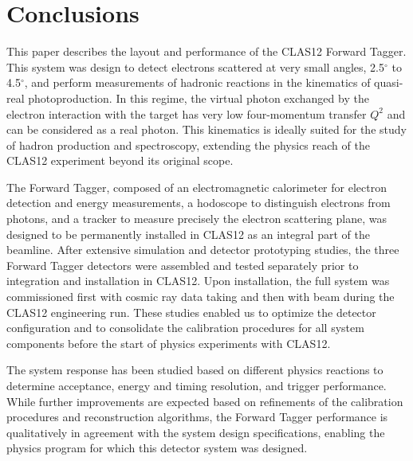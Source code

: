 \section{Conclusions}

This paper describes the layout and performance of the CLAS12 Forward Tagger. This system was design to detect
electrons scattered at very small angles, 2.5$^\circ$ to 4.5$^\circ$, and perform measurements of hadronic reactions
in the kinematics of quasi-real photoproduction. In this regime, the virtual photon exchanged by the electron
interaction with the target has very low four-momentum transfer $Q^2$ and can be considered as a real photon. This
kinematics is ideally suited for the study of hadron production and spectroscopy,  extending the physics reach of the
CLAS12 experiment beyond its original scope.

The Forward Tagger, composed of an electromagnetic calorimeter for electron detection and energy measurements,
a hodoscope to distinguish electrons from photons, and a tracker to measure precisely the electron scattering plane,
was designed to be permanently installed in CLAS12 as an integral part of the beamline. After extensive simulation
and detector prototyping studies, the three Forward Tagger detectors were assembled and tested separately prior
to integration and installation in CLAS12. Upon installation, the full system was commissioned first with cosmic ray
data taking and then with beam during the CLAS12 engineering run. These studies enabled us to optimize the detector
configuration and to consolidate the calibration procedures for all system components before the start of physics
experiments with CLAS12.

The system response has been studied based on different physics reactions to determine acceptance, energy and
timing resolution, and trigger performance. While further improvements are expected based on refinements of the
calibration procedures and reconstruction algorithms, the Forward Tagger performance is qualitatively in agreement
with the system design specifications, enabling the physics program for which this detector system was designed.
